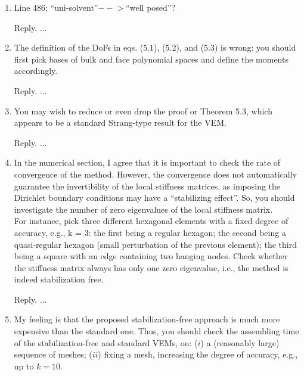 \documentclass[10pt]{amsart}
\theoremstyle{definition}
\theoremstyle{remark}
\begin{document}
\begin{enumerate}[1.]
\medskip

\item \textsf{Line 486; “uni-solvent”$-\!\!\!-\!\!\!>$“well posed”?}

\smallskip \noindent \textcolor[rgb]{1.00,0.00,0.00}{Reply.}
...

\medskip

\item \textsf{The definition of the DoFs in eqs. (5.1), (5.2), and (5.3) is wrong: you should first pick bases of bulk and face polynomial spaces and define the moments accordingly.}

\smallskip \noindent \textcolor[rgb]{1.00,0.00,0.00}{Reply.}
...

\medskip

\item \textsf{You may wish to reduce or even drop the proof or Theorem 5.3, which appears to be a standard Strang-type result for the VEM.}

\smallskip \noindent \textcolor[rgb]{1.00,0.00,0.00}{Reply.}
...

\medskip

\item \textsf{In the numerical section, I agree that it is important to check the rate of convergence of the method.
However, the convergence does not automatically guarantee the invertibility of the local stiffness matrices, as imposing the Dirichlet boundary conditions may have a “stabilizing effect”. So, you should investigate the number of zero eigenvalues of the local stiffness matrix.\\
For instance, pick three different hexagonal elements with a fixed degree of accuracy, e.g., k = 3: the first being a regular hexagon; the second being a quasi-regular hexagon (small perturbation of the previous element); the third being a square with an edge containing two hanging nodes. Check whether the stiffness matrix always has only one zero eigenvalue, i.e., the method is indeed stabilization free.}

\smallskip \noindent \textcolor[rgb]{1.00,0.00,0.00}{Reply.}
...

\medskip

\item \textsf{My feeling is that the proposed stabilization-free approach is much more expensive than the standard one. Thus, you should check the assembling time of the stabilization-free and standard VEMs, on: ($i$) a (reasonably large) sequence of meshes; ($ii$) fixing a mesh, increasing the degree of accuracy, e.g., up to $k = 10$.}


\end{enumerate}
\end{document}
